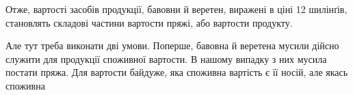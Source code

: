 Отже, вартості засобів продукції, бавовни й веретен, виражені
в ціні 12 шилінґів, становлять складові частини вартости пряжі,
або вартости продукту.

Але тут треба виконати дві умови. Поперше, бавовна й веретена
мусили дійсно служити для продукції споживної вартости.
В нашому випадку з них мусила постати пряжа. Для вартости
байдуже, яка споживна вартість є її носій, але якась споживна
\parbreak{}  %
